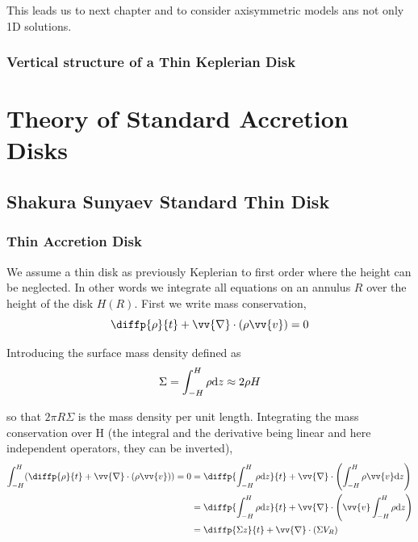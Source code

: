 \documentclass[10pt,a4paper,english]{article}
\let\originalleft\left
\let\originalright\right
\renewcommand{\left}{\mathopen{}\mathclose\bgroup\originalleft}
\renewcommand{\right}{\aftergroup\egroup\originalright}
\begin{document}
This leads us to next chapter and to consider axisymmetric models ans
not only 1D solutions.

\subsubsection{Vertical structure of a Thin Keplerian Disk}

\section{Theory of Standard Accretion Disks}

\subsection{Shakura Sunyaev Standard Thin Disk}

\subsubsection{Thin Accretion Disk}


We assume a thin disk as previously Keplerian to first order where the height
can be neglected. In other words we integrate all equations on an annulus $R$
over the height of the disk $H(R)$. First we write mass conservation,
\begin{equation*}
    \diffp{\rho}{t} + \vv{\nabla}\cdot(\rho \vv{v}) = 0
\end{equation*}

Introducing the surface mass density defined as
\begin{equation*}
    \Sigma = \int_{-H}^H \rho \mathrm{d}{z} \approx 2 \rho H
\end{equation*}

so that $2 \pi R \Sigma$ is the mass density per unit length. Integrating the
mass conservation over H (the integral and the derivative being linear and here
independent operators, they can be inverted),
\begin{align*}
    \int_{-H}^H \left( \diffp{\rho}{t} + \vv{\nabla}\cdot(\rho \vv{v}) \right) = 0 %
    &= \diffp{\int_{-H}^H \rho \d{z}}{t} + \vv{\nabla}\cdot\left( \int_{-H}^H \rho \vv{v} \d{z} \right) \\
    &= \diffp{\int_{-H}^H \rho \d{z}}{t} + \vv{\nabla}\cdot\left( \vv{v} \int_{-H}^H \rho \d{z} \right) \\
    &= \diffp{\Sigma z}{t} + \vv{\nabla}\cdot(\Sigma V_R)
\end{align*}
\end{document}
